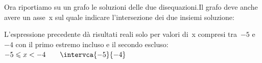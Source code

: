 \begin{esempio}{}{}
\begin{minipage}{.49\textwidth}
Ora riportiamo su un grafo le soluzioni delle due disequazioni.Il grafo deve 
anche avere un asse~x sul quale indicare l'intersezione dei due insiemi 
soluzione:
\end{minipage}
\hfill
\begin{minipage}{.49\textwidth}
\begin{center} \grrsistemab \end{center}
\end{minipage}
L'espressione precedente dà risultati reali solo per valori di~x compresi 
tra~\(-5\) e \(-4\) con il primo estremo incluso e il secondo escluso:\\ 
\(-5 \leqslant x < -4 \qquad \intervca{-5}{-4}\)

\end{esempio}
